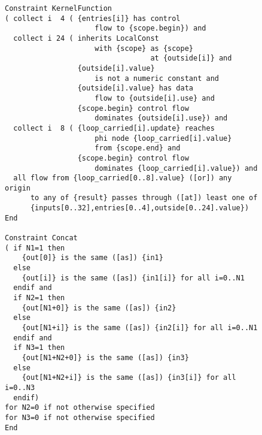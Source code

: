 \begin{figure}[p]
\begin{lstlisting}[language=IDL,basicstyle=\linespread{0.8}\small\ttfamily,
                   firstnumber=166]
Constraint KernelFunction
( collect i  4 ( {entries[i]} has control
                     flow to {scope.begin}) and
  collect i 24 ( inherits LocalConst
                     with {scope} as {scope}
                                  at {outside[i]} and
                 {outside[i].value}
                     is not a numeric constant and
                 {outside[i].value} has data
                     flow to {outside[i].use} and
                 {scope.begin} control flow
                     dominates {outside[i].use}) and
  collect i  8 ( {loop_carried[i].update} reaches
                     phi node {loop_carried[i].value}
                     from {scope.end} and
                 {scope.begin} control flow
                     dominates {loop_carried[i].value}) and
  all flow from {loop_carried[0..8].value} ([or]) any origin
      to any of {result} passes through ([at]) least one of
      {inputs[0..32],entries[0..4],outside[0..24].value})
End

Constraint Concat
( if N1=1 then
    {out[0]} is the same ([as]) {in1}
  else
    {out[i]} is the same ([as]) {in1[i]} for all i=0..N1
  endif and
  if N2=1 then
    {out[N1+0]} is the same ([as]) {in2}
  else
    {out[N1+i]} is the same ([as]) {in2[i]} for all i=0..N1
  endif and
  if N3=1 then
    {out[N1+N2+0]} is the same ([as]) {in3}
  else
    {out[N1+N2+i]} is the same ([as]) {in3[i]} for all i=0..N3
  endif)
for N2=0 if not otherwise specified
for N3=0 if not otherwise specified
End
\end{lstlisting}
\end{figure}
